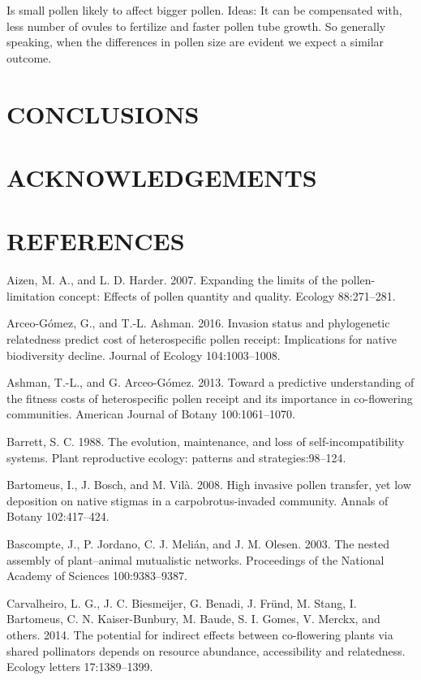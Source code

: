 \documentclass[11pt,a4paper]{article}
\begin{document}
Is small pollen likely to affect bigger pollen. Ideas: It can be
compensated with, less number of ovules to fertilize and faster pollen
tube growth. So generally speaking, when the differences in pollen size
are evident we expect a similar outcome.

\section{CONCLUSIONS}\label{conclusions}

\section{ACKNOWLEDGEMENTS}\label{acknowledgements}

\section{REFERENCES}\label{references}

\hypertarget{refs}{}
\hypertarget{ref-aizen2007}{}
Aizen, M. A., and L. D. Harder. 2007. Expanding the limits of the
pollen-limitation concept: Effects of pollen quantity and quality.
Ecology 88:271--281.

\hypertarget{ref-arceo2016}{}
Arceo-Gómez, G., and T.-L. Ashman. 2016. Invasion status and
phylogenetic relatedness predict cost of heterospecific pollen receipt:
Implications for native biodiversity decline. Journal of Ecology
104:1003--1008.

\hypertarget{ref-ashman2013}{}
Ashman, T.-L., and G. Arceo-Gómez. 2013. Toward a predictive
understanding of the fitness costs of heterospecific pollen receipt and
its importance in co-flowering communities. American Journal of Botany
100:1061--1070.

\hypertarget{ref-barrett1988}{}
Barrett, S. C. 1988. The evolution, maintenance, and loss of
self-incompatibility systems. Plant reproductive ecology: patterns and
strategies:98--124.

\hypertarget{ref-bartomeus2008}{}
Bartomeus, I., J. Bosch, and M. Vilà. 2008. High invasive pollen
transfer, yet low deposition on native stigmas in a carpobrotus-invaded
community. Annals of Botany 102:417--424.

\hypertarget{ref-bascompte2003}{}
Bascompte, J., P. Jordano, C. J. Melián, and J. M. Olesen. 2003. The
nested assembly of plant--animal mutualistic networks. Proceedings of
the National Academy of Sciences 100:9383--9387.

\hypertarget{ref-carvalheiro2014}{}
Carvalheiro, L. G., J. C. Biesmeijer, G. Benadi, J. Fründ, M. Stang, I.
Bartomeus, C. N. Kaiser-Bunbury, M. Baude, S. I. Gomes, V. Merckx, and
others. 2014. The potential for indirect effects between co-flowering
plants via shared pollinators depends on resource abundance,
accessibility and relatedness. Ecology letters 17:1389--1399.
\end{document}
